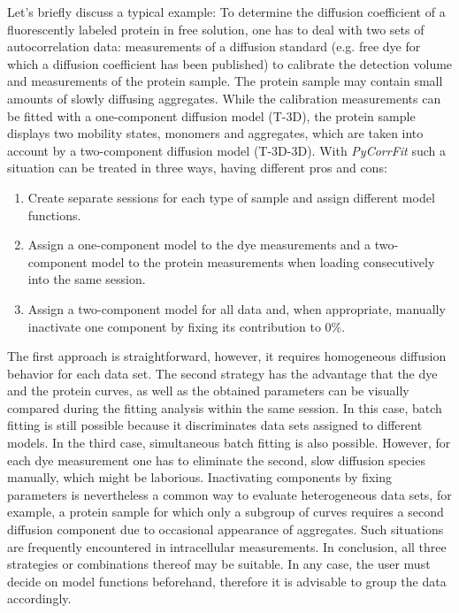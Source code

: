 Let's briefly discuss a typical example: To determine the diffusion coefficient of a fluorescently labeled protein in free solution, one has to deal with two sets of autocorrelation data: measurements of a diffusion standard (e.g. free dye for which a diffusion coefficient has been published) to calibrate the detection volume and measurements of the protein sample. The protein sample may contain small amounts of slowly diffusing aggregates. While the calibration measurements can be fitted with a one-component diffusion model (T-3D), the protein sample displays two mobility states, monomers and aggregates, which are taken into account by a two-component diffusion model (T-3D-3D). With \textit{PyCorrFit} such a situation can be treated in three ways, having different pros and cons: 


\begin{enumerate}
\item Create separate sessions for each type of sample and assign different model functions.
\item Assign a one-component model to the dye measurements and a two-component model to the protein measurements when loading consecutively into the same session.
\item Assign a two-component model for all data and, when appropriate, manually inactivate one component by fixing its contribution to 0\%.
\end{enumerate}


The first approach is straightforward, however, it requires homogeneous diffusion behavior for each data set. The second strategy has the advantage that the dye and the protein curves, as well as the obtained parameters can be visually compared during the fitting analysis within the same session. In this case, batch fitting is still possible because it discriminates data sets assigned to different models. In the third case, simultaneous batch fitting is also possible. However, for each dye measurement one has to eliminate the second, slow diffusion species manually, which might be laborious. Inactivating components by fixing parameters is nevertheless a common way to evaluate heterogeneous data sets, for example, a protein sample for which only a subgroup of curves requires a second diffusion component due to occasional appearance of aggregates. Such situations are frequently encountered in intracellular measurements. In conclusion, all three strategies or combinations thereof may be suitable. In any case, the user must decide on model functions beforehand, therefore it is advisable to group the data accordingly.

